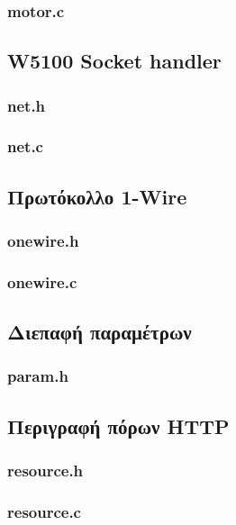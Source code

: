 \subsubsection*{motor.c}



\subsection*{W5100 Socket handler}
\subsubsection*{net.h}

\subsubsection*{net.c}



\subsection*{Πρωτόκολλο 1-Wire}
\subsubsection*{onewire.h}

\subsubsection*{onewire.c}



\subsection*{Διεπαφή παραμέτρων}
\subsubsection*{param.h}



\subsection*{Περιγραφή πόρων HTTP}
\subsubsection*{resource.h}

\subsubsection*{resource.c}



